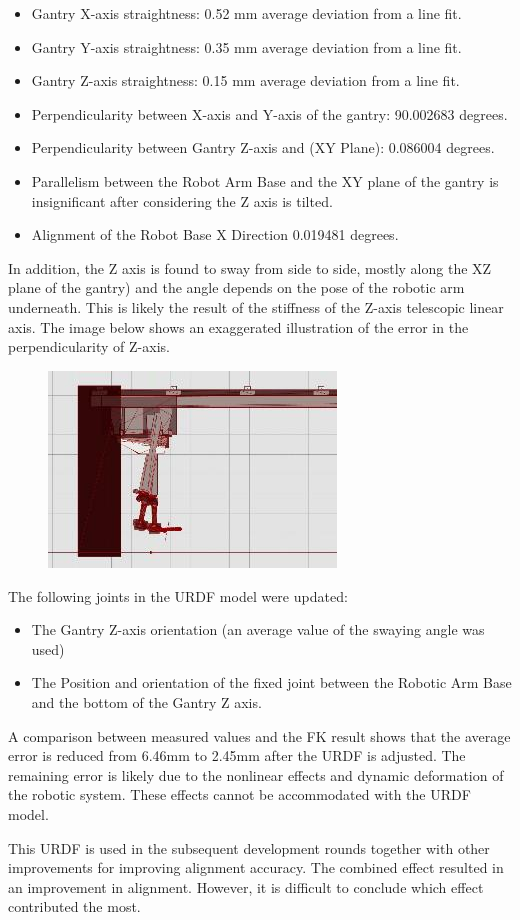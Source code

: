 \documentclass[11pt]{book}
\begin{document}
\begin{itemize}
	\item Gantry X-axis straightness: 0.52 mm average deviation from a line fit.

	\item Gantry Y-axis straightness: 0.35 mm average deviation from a line fit.

	\item Gantry Z-axis straightness: 0.15 mm average deviation from a line fit.

	\item Perpendicularity between X-axis and Y-axis of the gantry: 90.002683 degrees.

	\item Perpendicularity between Gantry Z-axis and (XY Plane): 0.086004 degrees.

	\item Parallelism between the Robot Arm Base and the XY plane of the gantry is insignificant after considering the Z axis is tilted.

	\item Alignment of the Robot Base X Direction 0.019481 degrees.

\end{itemize}
In addition, the Z axis is found to sway from side to side, mostly along the XZ plane of the gantry) and the angle depends on the pose of the robotic arm underneath. This is likely the result of the stiffness of the Z-axis telescopic linear axis. The image below shows an exaggerated illustration of the error in the perpendicularity of Z-axis.

\begin{figure}[H]
\includegraphics[width=7.64cm,height=5.22cm]{./images/image88.jpeg}
\end{figure}


The following joints in the URDF model were updated:

\begin{itemize}
	\item The Gantry Z-axis orientation (an average value of the swaying angle was used)

	\item The Position and orientation of the fixed joint between the Robotic Arm Base and the bottom of the Gantry Z axis.

\end{itemize}
A comparison between measured values and the FK result shows that the average error is reduced from 6.46mm to 2.45mm after the URDF is adjusted. The remaining error is likely due to the nonlinear effects and dynamic deformation of the robotic system. These effects cannot be accommodated with the URDF model.

This URDF is used in the subsequent development rounds together with other improvements for improving alignment accuracy. The combined effect resulted in an improvement in alignment. However, it is difficult to conclude which effect contributed the most. 
\end{document}

